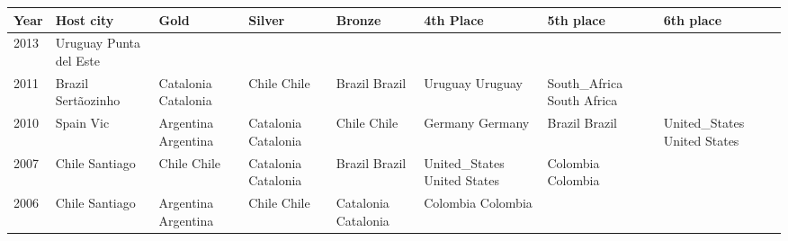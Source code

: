\documentclass{article}
\begin{document}
\begin{tabular}{llllllll}
\toprule
Year & Host city & Gold & Silver & Bronze & 4th Place & 5th place & 6th place \\
\midrule
2013 & Uruguay Punta del Este &  &  &  &  &  &  \\
2011 & Brazil Sertãozinho & Catalonia Catalonia & Chile Chile & Brazil Brazil & Uruguay Uruguay & South\_Africa South Africa &  \\
2010 & Spain Vic & Argentina Argentina & Catalonia Catalonia & Chile Chile & Germany Germany & Brazil Brazil & United\_States United States \\
2007 & Chile Santiago & Chile Chile & Catalonia Catalonia & Brazil Brazil & United\_States United States & Colombia Colombia &  \\
2006 & Chile Santiago & Argentina Argentina & Chile Chile & Catalonia Catalonia & Colombia Colombia &  &  \\
\bottomrule
\end{tabular}
\end{document}
